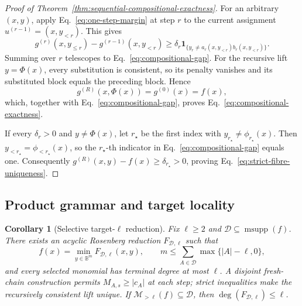 \documentclass[a4paper,onecolumn,11pt,unpublished]{quantumarticle}
\newtheorem{corollary}[corollary]{Corollary}
\theoremstyle{remark}
\begin{document}
\begin{proof}[Proof of Theorem~\ref{thm:sequential-compositional-exactness}]
For an arbitrary \((x,y)\), apply
Eq.~\eqref{eq:one-step-margin} at step \(r\) to the current assignment
\(u^{(r-1)}=(x,y_{<r})\).  This gives
\begin{equation}
  g^{(r)}(x,y_{\leq r})-g^{(r-1)}(x,y_{<r})
  \geq\delta_r
  \mathbf 1_{\{y_r\neq
  a_r(x,y_{<r})b_r(x,y_{<r})\}}.
  \label{eq:stepwise-compositional-gap}
\end{equation}
Summing over \(r\) telescopes to Eq.~\eqref{eq:compositional-gap}.  For the
recursive lift \(y=\Phi(x)\), every substitution is consistent, so its
penalty vanishes and its substituted block equals the preceding block.
Hence
\begin{equation}
  g^{(R)}(x,\Phi(x))=g^{(0)}(x)=f(x),
\end{equation}
which, together with Eq.~\eqref{eq:compositional-gap}, proves
Eq.~\eqref{eq:compositional-exactness}.

If every \(\delta_r>0\) and \(y\neq\Phi(x)\), let \(r_\star\) be the first
index with \(y_{r_\star}\neq\phi_{r_\star}(x)\).  Then
\(y_{<r_\star}=\phi_{<r_\star}(x)\), so the \(r_\star\)-th indicator in
Eq.~\eqref{eq:compositional-gap} equals one.  Consequently
\(g^{(R)}(x,y)-f(x)\geq\delta_{r_\star}>0\), proving
Eq.~\eqref{eq:strict-fibre-uniqueness}.
\end{proof}

\subsection{Product grammar and target locality}
\label{app:product-grammar}
\label{app:target-locality-proof}

\begin{corollary}[Selective target-\(\ell\) reduction]
\label{cor:selective-target-locality}
Fix \(\ell\geq2\) and \(\mathcal D\subseteq\operatorname{msupp}(f)\).  There
exists an acyclic Rosenberg reduction \(F_{\mathcal D,\ell}\) such that
\begin{equation}
  f(x)=\min_{y\in\mathbb B^m}F_{\mathcal D,\ell}(x,y),
  \qquad
  m\leq\sum_{A\in\mathcal D}\max\{|A|-\ell,0\},
  \label{eq:target-locality-bound}
\end{equation}
and every selected monomial has terminal degree at most \(\ell\).  A disjoint
fresh-chain construction permits \(M_{A,s}\geq|c_A|\) at each step; strict
inequalities make the recursively consistent lift unique.  If
\(\mathcal M_{>\ell}(f)\subseteq\mathcal D\), then
\(\deg(F_{\mathcal D,\ell})\leq\ell\).
\end{corollary}
\end{document}
